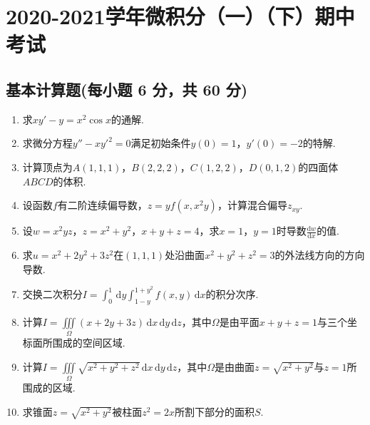 \documentclass[../Main.tex]{subfiles}
\begin{document}
\chapter{2020-2021学年微积分（一）（下）期中考试}

\section{基本计算题(每小题 6 分，共 60 分)}
\begin{enumerate}
    \item 求$xy'-y=x^{2}\cos x$的通解.
          \vspace{12em}

    \item 求微分方程$y''-xy'^{2}=0$满足初始条件$y(0)=1$，$y'(0)=-2$的特解.
          \vspace{12em}

    \item 计算顶点为$A(1,1,1)$，$B(2,2,2)$，$C(1,2,2)$，$D(0,1,2)$的四面体$ABCD$的体积.
          \vspace{12em}

    \item 设函数$f$有二阶连续偏导数，$z=yf\left(x,x^{2} y\right)$，计算混合偏导$z
                  _{xy}$.
          \vspace{13em}

    \item 设$w=x^{2} y z$，$z=x^{2}+y^{2}$，$x+y+z=4$，求$x=1$，$y=1$时导数$\frac{\mathrm{d}w}{\mathrm{d}x}$的值.
          \vspace{13em}

    \item 求$u=x^{2}+2y^{2}+3z^{2}$在$(1,1,1)$处沿曲面$x^{2}+y^{2}+z^{2}=3$的外法线方向的方向导数.
          \vspace{13em}

    \item 交换二次积分$I=\int_{0}^{1}\,\mathrm{d}y\int_{1-y}^{1+y^2}f(x,y)\,\mathrm{d}
              x$的积分次序.
          \vspace{13em}

    \item 计算$I=\iiint\limits_{\Omega}(x+2y+3z)\,\mathrm{d}x\,\mathrm{d}y\,\mathrm{d}z$，其中$\Omega$是由平面$x
              +y+z=1$与三个坐标面所围成的空间区域.
          \vspace{12em}

    \item 计算$I=\iiint\limits_{\Omega}\sqrt{x^{2}+y^{2}+z^{2}}\,\mathrm{d}x\,\mathrm{d}
              y\,\mathrm{d}z$，其中$\Omega$是由曲面$z=\sqrt{x^{2}+y^{2}}$与$z=1$所围成的区域.
          \vspace{12em}

    \item 求锥面$z=\sqrt{x^{2}+y^{2}}$被柱面$z^{2}=2x$所割下部分的面积$S$.
          \vspace{12em}
\end{enumerate}
\end{document}
